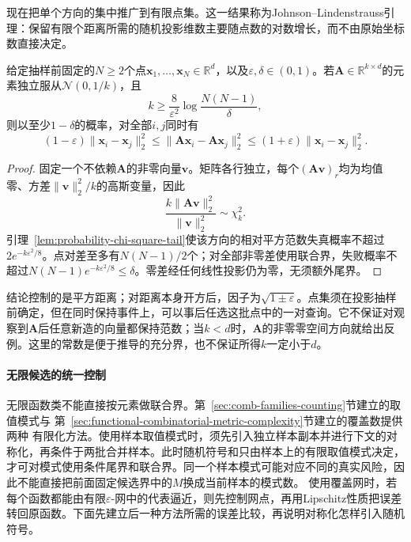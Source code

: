 现在把单个方向的集中推广到有限点集。这一结果称为Johnson--Lindenstrauss引理：保留有限个距离所需的随机投影维数主要随点数的对数增长，而不由原始坐标数直接决定。
\begin{theorem}[高斯随机投影的距离保持]
  \label{thm:probability-johnson-lindenstrauss}
  给定抽样前固定的\(N\geq2\)个点\(\bm x_1,\ldots,\bm x_N\in\mathbb R^d\)，以及\(\varepsilon,\delta\in(0,1)\)。若\(\bm A\in\mathbb R^{k\times d}\)的元素独立服从\(\mathcal N(0,1/k)\)，且
  \[
    k\geq\frac8{\varepsilon^2}\log\frac{N(N-1)}\delta,
  \]
  则以至少\(1-\delta\)的概率，对全部\(i,j\)同时有
  \begin{equation}
    (1-\varepsilon)\|\bm x_i-\bm x_j\|_2^2
    \leq\|\bm A\bm x_i-\bm A\bm x_j\|_2^2
    \leq(1+\varepsilon)\|\bm x_i-\bm x_j\|_2^2.
    \label{eq:probability-jl-distance-preservation}
  \end{equation}
\end{theorem}
\begin{proof}
固定一个不依赖\(\bm A\)的非零向量\(\bm v\)。矩阵各行独立，每个\((\bm A\bm v)_r\)均为均值零、方差\(\|\bm v\|_2^2/k\)的高斯变量，因此
\[
  \frac{k\|\bm A\bm v\|_2^2}{\|\bm v\|_2^2}\sim\chi_k^2.
\]
引理~\ref{lem:probability-chi-square-tail}使该方向的相对平方范数失真概率不超过\(2e^{-k\varepsilon^2/8}\)。点对差至多有\(N(N-1)/2\)个；对全部非零差使用联合界，失败概率不超过\(N(N-1)e^{-k\varepsilon^2/8}\leq\delta\)。零差经任何线性投影仍为零，无须额外尾界。
\end{proof}
结论控制的是平方距离；对距离本身开方后，因子为\(\sqrt{1\pm\varepsilon}\)。点集须在投影抽样前确定，但在同时保持事件上，可以事后任选这批点中的一对查询。它不保证对观察到\(\bm A\)后任意新造的向量都保持范数；当\(k<d\)时，\(\bm A\)的非零零空间方向就给出反例。这里的常数是便于推导的充分界，也不保证所得\(k\)一定小于\(d\)。

\paragraph{无限候选的统一控制}
无限函数类不能直接按元素做联合界。第~\ref{sec:comb-families-counting}节建立的取值模式与
第~\ref{sec:functional-combinatorial-metric-complexity}节建立的覆盖数提供两种
有限化方法。使用样本取值模式时，须先引入独立样本副本并进行下文的对称化，再条件于两批合并样本。此时随机符号和只由样本上的有限取值模式决定，才可对模式使用条件尾界和联合界。同一个样本模式可能对应不同的真实风险，因此不能直接把前面固定候选界中的\(M\)换成当前样本的模式数。
使用覆盖网时，若每个函数都能由有限\(\varepsilon\)-网中的代表逼近，则先控制网点，再用Lipschitz性质把误差转回原函数。下面先建立后一种方法所需的误差比较，再说明对称化怎样引入随机符号。

